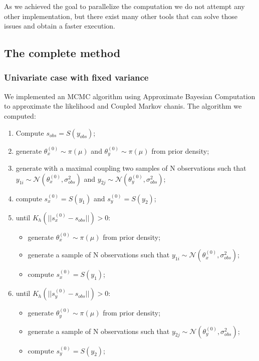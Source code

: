 \documentclass {article}
\begin{document}
As we achieved the goal to parallelize the computation we do not attempt any other implementation, but there exist many other tools that can solve those issues and obtain a faster execution.

 
\clearpage

\subsection{The complete method}

\subsubsection{Univariate case with fixed variance}

We implemented an MCMC algorithm using Approximate Bayesian Computation to approximate the likelihood and Coupled Markov chanis.
The algorithm we computed: 

\begin{enumerate}
	\item Compute $s_{obs} = S(y_{obs})$;
	\item generate $\theta_{x}^{(0)} \sim  \pi(\mu)$ and $\theta_{y}^{(0)} \sim  \pi(\mu)$ from prior density;
	\item generate with a maximal coupling two samples of N observations such that $y_{1i} \sim \mathcal{N}(\theta_{x}^{(0)}, \sigma_{obs} ^2)$ and  $y_{2j} \sim \mathcal{N}(\theta_{y}^{(0)}, \sigma_{obs} ^2)$;
	\item compute $s_{x}^{(0)}=S(y_{1})$ and $s_{y}^{(0)}=S(y_{2})$;
	\item until $K_h(||s_{x}^{(0)}-s_{obs}||)>0$:
	\begin{itemize}
		\item generate $\theta_{x}^{(0)} \sim  \pi(\mu)$ from prior density;
		\item generate a sample of N observations such that $y_{1i} \sim \mathcal{N}(\theta_{x}^{(0)}, \sigma_{obs} ^2)$;
		\item compute $s_{x}^{(0)}=S(y_{1})$;
	\end{itemize}
	\item until $K_h(||s_{y}^{(0)}-s_{obs}||)>0$:
	\begin{itemize}
		\item generate $\theta_{y}^{(0)} \sim  \pi(\mu)$ from prior density;
		\item generate a sample of N observations such that $y_{2j} \sim \mathcal{N}(\theta_{y}^{(0)}, \sigma_{obs} ^2)$;
		\item compute $s_{y}^{(0)}=S(y_{2})$;
	\end{itemize}
	
\end{enumerate}
\end{document}
